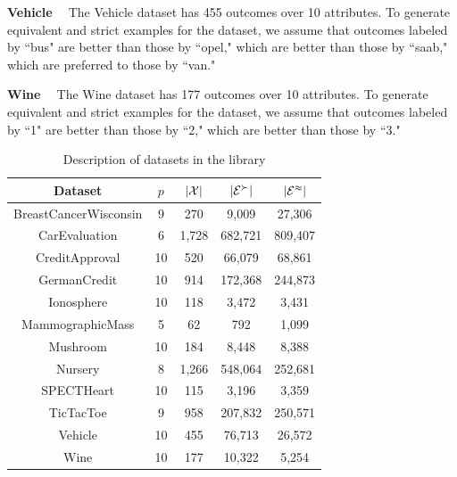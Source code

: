 \smallskip \noindent \textbf{Vehicle \ }
The Vehicle dataset has 455 outcomes over 10 attributes.
To generate equivalent and strict examples for the dataset,
we assume that outcomes labeled by ``bus" are better than
those by ``opel," which are better than those
by ``saab," which are preferred to those by ``van."

\smallskip \noindent \textbf{Wine \ }
The Wine dataset has 177 outcomes over 10 attributes.
To generate equivalent and strict examples for the dataset,
we assume that outcomes labeled by ``1" are better than
those by ``2," which are better than those
by ``3."


\begin{table}
	\centering
	\small
	\begin{tabular}{ |c||c|c|c|c| } 
		\hline
		Dataset          & $p$  & $|\mathcal{X}|$ & $|\mathcal{E}^\succ|$ & $|\mathcal{E}^\approx|$ \\
		\hline \hline
		BreastCancerWisconsin              & 9    & 270 & 9,009 & 27,306 \\ \hline
		CarEvaluation               & 6    & 1,728 & 682,721 & 809,407\\ \hline
		CreditApproval               & 10   & 520 & 66,079 & 68,861 \\ \hline
		GermanCredit               & 10   & 914 & 172,368 & 244,873 \\ \hline
		Ionosphere               & 10   & 118 & 3,472 & 3,431 \\	\hline
		MammographicMass               & 5    & 62 & 792 & 1,099 \\	\hline
		Mushroom               & 10   & 184 & 8,448 & 8,388 \\	\hline
		Nursery               & 8    & 1,266 & 548,064 & 252,681 \\	\hline
		SPECTHeart               & 10   & 115 & 3,196 & 3,359 \\	\hline
		TicTacToe              & 9    & 958 & 207,832 & 250,571 \\ \hline
		Vehicle               & 10   & 455 & 76,713 & 26,572 \\ \hline
		Wine               & 10   & 177 & 10,322 & 5,254 \\
		\hline
	\end{tabular}
	\caption{Description of datasets in the library}
	\label{tbl:description}
\end{table}


